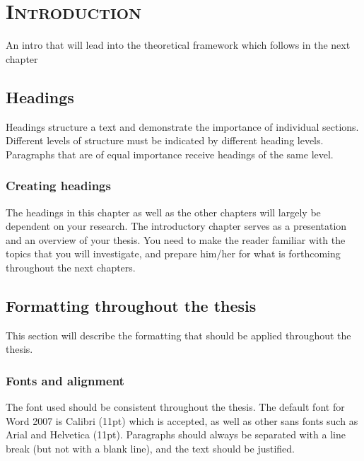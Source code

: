 %
%
% 
% 
% 

\chapter{\textsc{Introduction}}
\label{chap:intro}

An intro that will lead into the theoretical framework which follows in the next chapter

\section{Headings}
\label{sec:heading}

Headings structure a text and demonstrate the importance of individual sections. Different levels of structure must be indicated by different heading levels. 
Paragraphs that are of equal importance receive headings of the same level.

\subsection{Creating headings}
\label{sec:}

The headings in this chapter as well as the other chapters will largely be dependent on your research. The introductory chapter serves as a presentation and an overview of your thesis. You need to make the reader familiar with the topics that you will investigate, and prepare him/her for what is forthcoming throughout the next chapters. 

\section{Formatting throughout the thesis}
This section will describe the formatting that should be applied throughout the thesis.

\subsection{Fonts and alignment}
\label{sec:fonts}
The font used should be consistent throughout the thesis. The default font for Word 2007 is Calibri (11pt) which is accepted, 
as well as other sans fonts such as Arial and Helvetica (11pt). 
Paragraphs should always be separated with a line break (but not with a blank line), and the text should be justified. 

